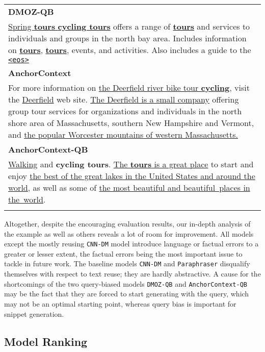 \documentclass[sigconf]{acmart}
\begin{document}
\begin{table}[t]
\begin{tabular}{@{}l@{}}
\addlinespace
\midrule
\addlinespace
\bfseries DMOZ-QB\\[0.5ex]
\parbox{\columnwidth}{\ul{Spring }{\ul{\bf tours}}\ul{ }\ul{\bf cycling tours} offers a range of {\ul{\bf tours}} and services to individuals and groups in the north bay area. Includes information on {\ul{\bf tours}}, {\ul{\bf tours}}, events, and activities. Also includes a guide to the \ul{\small\tt <eos>}} \\
\addlinespace
\midrule
\addlinespace
\bfseries AnchorContext \\[0.5ex]
\parbox{\columnwidth}{For more information on \ul{the Deerfield river bike tour }\ul{\bf cycling}, visit the \ul{Deerfield} web site. \ul{The Deerfield is a small company} offering group tour services for organizations and individuals in the north shore area of Massachusetts, southern New Hampshire and Vermont, and \ul{the popular Worcester mountains of western Massachusetts.}} \\
\addlinespace
\midrule
\addlinespace
\bfseries AnchorContext-QB \\[0.5ex]
\parbox{\columnwidth}{\ul{Walking} and {\bf cycling tours}. \ul{The }\ul{\bf tours}\ul{ is a great place} to start and enjoy \ul{the best of the great lakes in the United States and around the world,} as well as some of \ul{the most beautiful and }{\ul{\mbox{beautiful places}}}\ul{ in }{\ul{\mbox{the world}}}.} \\
\addlinespace
\bottomrule
\end{tabular}\end{table}
 
Altogether, despite the encouraging evaluation results, our in-depth analysis of the example as well as others reveals a lot of room for improvement. All models except the mostly reusing {\small\tt CNN-DM} model introduce language or factual errors to a greater or lesser extent, the factual errors being the most important issue to tackle in future work. The baseline models {\small\tt CNN-DM} and {\small\tt Paraphraser} disqualify themselves with respect to text reuse; they are hardly abstractive. A cause for the shortcomings of the two query-biased models {\small\tt DMOZ-QB} and {\small\tt AnchorContext-QB} may be the fact that they are forced to start generating with the query, which may not be an optimal starting point, whereas query bias is important for snippet generation. 

\subsection{Model Ranking}
\end{document}
